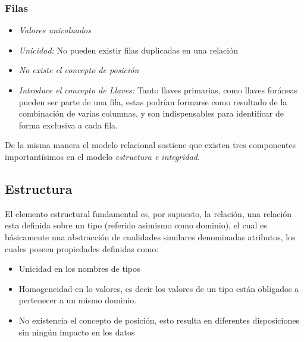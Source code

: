 \subsubsection{Filas}
\begin{itemize}
    \item \textit{Valores univaluados}
    \item \textit{Unicidad:} No pueden existir filas duplicadas en una relación
    \item \textit{No existe el concepto de posición}
    \item \textit{Introduce el concepto de Llaves:} Tanto llaves primarias, como llaves foráneas pueden ser
                  parte de una fila, estas podrían formarse como resultado de la combinación de varias columnas,
                  y son indispensables para identificar de forma exclusiva a cada fila.
\end{itemize}
\noindent De la misma manera el modelo relacional sostiene que existen tres componentes importantísimos en el modelo \textit {estructura e integridad}.
\subsection{Estructura}
\noindent El elemento estructural fundamental es, por supuesto, la relación, una relación esta definida sobre un tipo
\noindent (referido asimismo como dominio), el cual es básicamente una abstracción de cualidades similares denominadas atributos,
\noindent los cuales poseen propiedades definidas como:
\begin{itemize}
    \item Unicidad en los nombres de tipos
    \item Homogeneidad en lo valores, es decir los valores de un tipo están obligados a pertenecer a un mismo dominio.
    \item No existencia el concepto de posición, esto resulta en diferentes disposiciones sin ningún impacto en los datos
\end{itemize}
